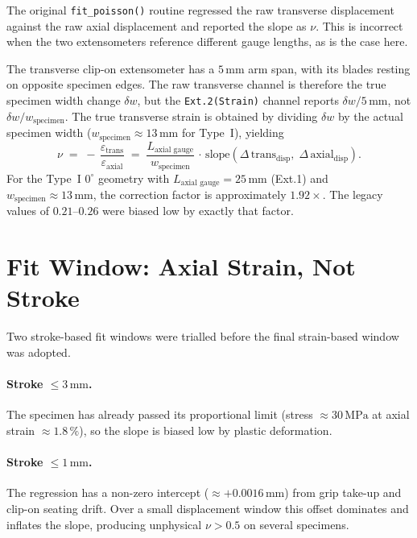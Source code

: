 The original \texttt{fit\_poisson()} routine regressed the raw transverse
displacement against the raw axial displacement and reported the slope as
$\nu$. This is incorrect when the two extensometers reference different gauge
lengths, as is the case here.

The transverse clip-on extensometer has a $5\,\mathrm{mm}$ arm span, with its
blades resting on opposite specimen edges. The raw transverse channel is
therefore the true specimen width change $\delta w$, but the
\texttt{Ext.2(Strain)} channel reports $\delta w / 5\,\mathrm{mm}$, not
$\delta w / w_{\text{specimen}}$. The true transverse strain is obtained by
dividing $\delta w$ by the actual specimen width
($w_{\text{specimen}} \approx 13\,\mathrm{mm}$ for Type~I), yielding
%
\begin{equation}
  \nu \;=\; -\,\frac{\varepsilon_{\text{trans}}}{\varepsilon_{\text{axial}}}
        \;=\; \frac{L_{\text{axial gauge}}}{w_{\text{specimen}}}
        \,\cdot\, \mathrm{slope}\!\left(\Delta\,\text{trans}_{\text{disp}},\;
        \Delta\,\text{axial}_{\text{disp}}\right).
  \label{eq:poisson-correct}
\end{equation}
%
For the Type~I $0^{\circ}$ geometry with $L_{\text{axial gauge}} = 25\,\mathrm{mm}$
(Ext.1) and $w_{\text{specimen}} \approx 13\,\mathrm{mm}$, the correction factor
is approximately $1.92\times$. The legacy values of $0.21$--$0.26$ were biased
low by exactly that factor.

\section{Fit Window: Axial Strain, Not Stroke}
\label{sec:poisson-window}

Two stroke-based fit windows were trialled before the final strain-based window
was adopted.

\paragraph{Stroke $\leq 3\,\mathrm{mm}$.}
The specimen has already passed its proportional limit
(stress $\approx 30\,\mathrm{MPa}$ at axial strain $\approx 1.8\,\%$), so the
slope is biased low by plastic deformation.

\paragraph{Stroke $\leq 1\,\mathrm{mm}$.}
The regression has a non-zero intercept ($\approx +0.0016\,\mathrm{mm}$) from
grip take-up and clip-on seating drift. Over a small displacement window this
offset dominates and inflates the slope, producing unphysical $\nu > 0.5$ on
several specimens.

